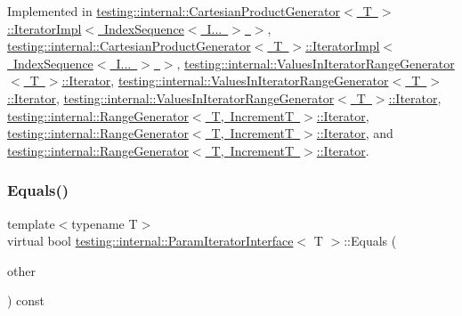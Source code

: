 Implemented in \mbox{\hyperlink{classtesting_1_1internal_1_1_cartesian_product_generator_1_1_iterator_impl_3_01_index_sequence_3_01_i_8_8_8_01_4_01_4_ab7052f320ab8ff3113a3e744a1bff07e}{testing\+::internal\+::\+Cartesian\+Product\+Generator$<$ T $>$\+::\+Iterator\+Impl$<$ Index\+Sequence$<$ I... $>$ $>$}}, \mbox{\hyperlink{classtesting_1_1internal_1_1_cartesian_product_generator_1_1_iterator_impl_3_01_index_sequence_3_01_i_8_8_8_01_4_01_4_ab7052f320ab8ff3113a3e744a1bff07e}{testing\+::internal\+::\+Cartesian\+Product\+Generator$<$ T $>$\+::\+Iterator\+Impl$<$ Index\+Sequence$<$ I... $>$ $>$}}, \mbox{\hyperlink{classtesting_1_1internal_1_1_values_in_iterator_range_generator_1_1_iterator_a55bd2a0d5a630478e32ec2efe08e37e4}{testing\+::internal\+::\+Values\+In\+Iterator\+Range\+Generator$<$ T $>$\+::\+Iterator}}, \mbox{\hyperlink{classtesting_1_1internal_1_1_values_in_iterator_range_generator_1_1_iterator_a55bd2a0d5a630478e32ec2efe08e37e4}{testing\+::internal\+::\+Values\+In\+Iterator\+Range\+Generator$<$ T $>$\+::\+Iterator}}, \mbox{\hyperlink{classtesting_1_1internal_1_1_values_in_iterator_range_generator_1_1_iterator_a37b25780b27c16195042003eaa1a286a}{testing\+::internal\+::\+Values\+In\+Iterator\+Range\+Generator$<$ T $>$\+::\+Iterator}}, \mbox{\hyperlink{classtesting_1_1internal_1_1_range_generator_1_1_iterator_acbdfc5919d37fb9514914afb041e50ff}{testing\+::internal\+::\+Range\+Generator$<$ T, Increment\+T $>$\+::\+Iterator}}, \mbox{\hyperlink{classtesting_1_1internal_1_1_range_generator_1_1_iterator_acbdfc5919d37fb9514914afb041e50ff}{testing\+::internal\+::\+Range\+Generator$<$ T, Increment\+T $>$\+::\+Iterator}}, and \mbox{\hyperlink{classtesting_1_1internal_1_1_range_generator_1_1_iterator_a4a8d7908d5201913ba37b6bf2a6f9884}{testing\+::internal\+::\+Range\+Generator$<$ T, Increment\+T $>$\+::\+Iterator}}.

\mbox{\label{classtesting_1_1internal_1_1_param_iterator_interface_a9d811697a752d46f7bd6a0082f9040a3}} 
\subsubsection{\texorpdfstring{Equals()}{Equals()}\hspace{0.1cm}{\footnotesize\ttfamily [1/3]}}
{\footnotesize\ttfamily template$<$typename T$>$ \\
virtual bool \mbox{\hyperlink{classtesting_1_1internal_1_1_param_iterator_interface}{testing\+::internal\+::\+Param\+Iterator\+Interface}}$<$ T $>$\+::Equals (\begin{DoxyParamCaption}\item[{const \mbox{\hyperlink{classtesting_1_1internal_1_1_param_iterator_interface}{Param\+Iterator\+Interface}}$<$ T $>$ \&}]{other }\end{DoxyParamCaption}) const\hspace{0.3cm}{\ttfamily [pure virtual]}}



